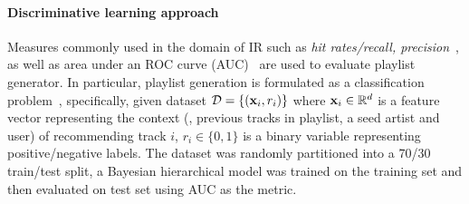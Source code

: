 \paragraph{Discriminative learning approach}
Measures commonly used in the domain of IR such as \emph{hit rates/recall, precision}~\cite{recsysbook2015,bonnin2015automated},
as well as area under an ROC curve (AUC)~\cite{bengroove2017} are used to evaluate playlist generator.
In particular, playlist generation is formulated as a classification problem~\cite{bengroove2017}, specifically, 
given dataset $\mathcal{D} = \{(\mathbf{x}_i, r_i)\}$ where $\mathbf{x}_i \in \mathbb{R}^d$ is a feature vector representing 
the context (\ie, previous tracks in playlist, a seed artist and user) of recommending track $i$,
$r_i \in \{0, 1\}$ is a binary variable representing positive/negative labels.
The dataset was randomly partitioned into a 70/30 train/test split, 
a Bayesian hierarchical model was trained on the training set and then evaluated on test set using AUC as the metric.

